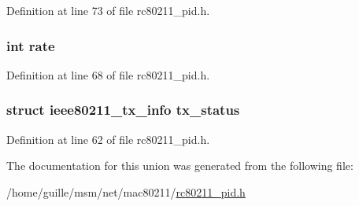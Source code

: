 Definition at line 73 of file rc80211\-\_\-pid.\-h.

\hypertarget{unionrc__pid__event__data_a7a829e6fd74e94e0edf10550470d844c}{
\subsubsection[{rate}]{\setlength{\rightskip}{0pt plus 5cm}int rate}}\label{unionrc__pid__event__data_a7a829e6fd74e94e0edf10550470d844c}


Definition at line 68 of file rc80211\-\_\-pid.\-h.

\hypertarget{unionrc__pid__event__data_ad0580b6e8aa75d244c97d299b7bac298}{
\subsubsection[{tx\-\_\-status}]{\setlength{\rightskip}{0pt plus 5cm}struct ieee80211\-\_\-tx\-\_\-info tx\-\_\-status}}\label{unionrc__pid__event__data_ad0580b6e8aa75d244c97d299b7bac298}


Definition at line 62 of file rc80211\-\_\-pid.\-h.



The documentation for this union was generated from the following file\-:\begin{DoxyCompactItemize}
\item 
/home/guille/msm/net/mac80211/\hyperlink{rc80211__pid_8h}{rc80211\-\_\-pid.\-h}\end{DoxyCompactItemize}
